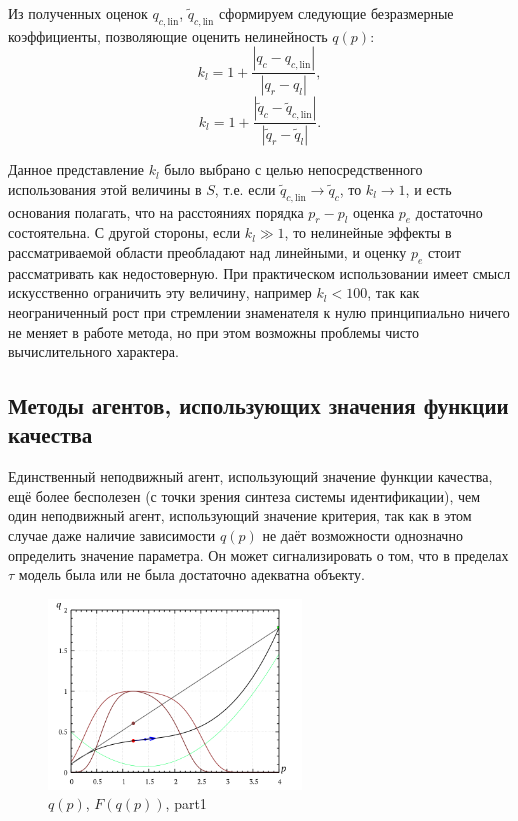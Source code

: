Из полученных оценок $q_{c,\mathrm{lin}}$, $\tilde{q}_{c,\mathrm{lin}}$
сформируем следующие безразмерные коэффициенты, позволяющие оценить
нелинейность $q(p)$:
%
\begin{equation}
  k_l = 1 + \frac{|q_c - q_{c,\mathrm{lin}}|}{|q_r-q_l|} ,
  \label{atu:eq:k_l1}
\end{equation}
%
\begin{equation}
  k_l = 1 + \frac{|\tilde{q}_c - \tilde{q}_{c,\mathrm{lin}}|}{ |\tilde{q}_r-\tilde{q}_l|} .
  \label{atu:eq:k_l2}
\end{equation}

Данное представление $k_l$ было выбрано с целью непосредственного использования
этой величины в $S$, т.е. если $\tilde{q}_{c,\mathrm{lin}} \to \tilde{q}_c$,
то $k_l \to 1$, и есть основания полагать, что на расстояниях порядка $p_r-p_l$
оценка $p_e$ достаточно состоятельна. С другой стороны,
если $k_l \gg 1 $, то нелинейные эффекты в рассматриваемой области
преобладают над линейными, и оценку $p_e$  стоит рассматривать как недостоверную.
При практическом использовании имеет смысл искусственно ограничить эту величину,
например $k_l < 100 $, так как неограниченный рост при стремлении знаменателя
к нулю принципиально ничего не меняет в работе метода, но при этом
возможны проблемы чисто вычислительного характера.






\subsection{Методы агентов, использующих значения функции качества }  %

Единственный неподвижный агент,
использующий значение функции качества,
ещё более бесполезен (с точки зрения синтеза системы идентификации),
чем один неподвижный агент,
использующий значение критерия, так как в этом случае даже наличие
зависимости $q(p)$ не даёт возможности однозначно определить
значение параметра.
Он может сигнализировать о том, что в пределах
\(\tau\) модель была или не была достаточно адекватна
объекту.

\begin{figure}[htb!]
  \centerline{\includegraphics[width=0.6\textwidth]{pq_1x2.png} }
  \caption{ $q(p)$, $F(q(p))$, part1 }
  \label{atu:pq_1x2}
\end{figure}

